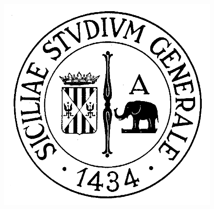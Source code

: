 \documentclass[11pt, a4paper, twoside, notitlepage]{report}
\begin{document}
\begin{figure}[h] \hspace*{140pt}
\includegraphics[scale=0.2]{img/unict-bianco.png}
\end{figure}
\end{document}
